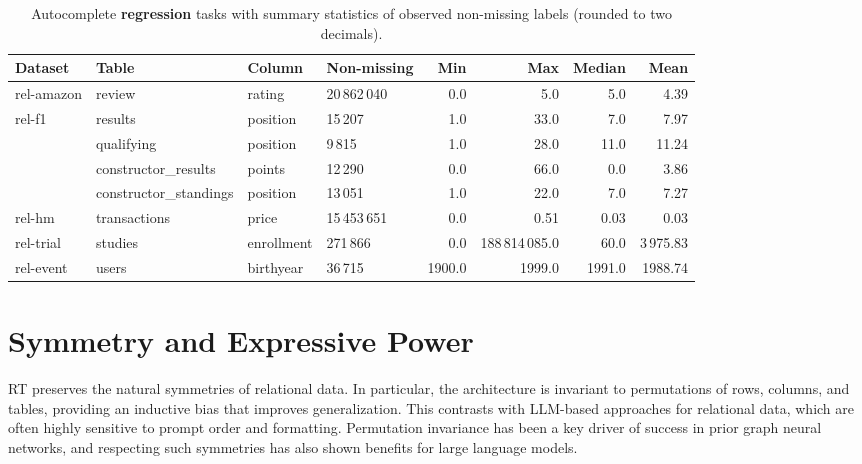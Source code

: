 \begin{table}[t]
\centering
\scriptsize
\begin{tabular}{llllrrrr}
\toprule
Dataset & Table & Column & Non-missing & Min & Max & Median & Mean \\
\midrule
\multirow{1}{*}{rel-amazon}
  & review & rating & 20\,862\,040 & 0.0 & 5.0 & 5.0 & 4.39 \\
\cmidrule(lr){1-8}
\multirow{4}{*}{rel-f1}
  & results               & position & 15\,207 & 1.0 & 33.0 & 7.0  & 7.97 \\
\cmidrule(lr){2-8}
  & qualifying            & position & 9\,815  & 1.0 & 28.0 & 11.0 & 11.24 \\
\cmidrule(lr){2-8}
  & constructor\_results  & points   & 12\,290 & 0.0 & 66.0 & 0.0 & 3.86 \\
\cmidrule(lr){2-8}
  & constructor\_standings & position & 13\,051 & 1.0 & 22.0 & 7.0  & 7.27 \\
\cmidrule(lr){1-8}
\multirow{1}{*}{rel-hm}
  & transactions & price & 15\,453\,651 & 0.0 & 0.51 & 0.03 & 0.03 \\
\cmidrule(lr){1-8}
\multirow{1}{*}{rel-trial}
  & studies & enrollment & 271\,866 & 0.0 & 188\,814\,085.0 & 60.0 & 3\,975.83 \\
\cmidrule(lr){1-8}
\multirow{1}{*}{rel-event}
  & users & birthyear & 36\,715 & 1900.0 & 1999.0 & 1991.0 & 1988.74 \\
\bottomrule
\end{tabular}
\caption{Autocomplete \textbf{regression} tasks with summary statistics of observed non-missing labels (rounded to two decimals).}
\label{tab:autocomplete_reg}
\end{table}













\section{Symmetry and Expressive Power}
\label{app:expressive_power}

RT preserves the natural symmetries of relational data.  
In particular, the architecture is invariant to permutations of rows, columns, and tables, providing an inductive bias that improves generalization.  
This contrasts with LLM-based approaches for relational data, which are often highly sensitive to prompt order and formatting.  
Permutation invariance has been a key driver of success in prior graph neural networks, and respecting such symmetries has also shown benefits for large language models.

